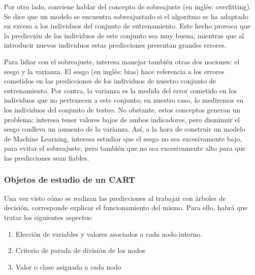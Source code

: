 \documentclass[12pt,twoside]{article}
\begin{document}
Por otro lado, conviene hablar del concepto de sobreajuste (en inglés: overfitting). Se dice que un modelo se encuentra sobreajustado si el algoritmo se ha adaptado en exceso a los individuos del conjunto de entrenamiento. Este hecho provoca que la predicción de los individuos de este conjunto sea muy buena, mientras que al introducir nuevos individuos estas predicciones presentan grandes errores.

Para lidiar con el sobreajuste, interesa manejar también otras dos nociones: el sesgo y la varianza. El sesgo (en inglés: bias) hace referencia a los errores cometidos en las predicciones de los individuos de nuestro conjunto de entrenamiento. Por contra, la varianza es la medida del error cometido en los individuos que no pertenecen a este conjunto; en nuestro caso, lo mediremos en los individuos del conjunto de testeo. No obstante, estos conceptos generan un problema: interesa tener valores bajos de ambos indicadores, pero disminuir el sesgo conlleva un aumento de la varianza. Así, a la hora de construir un modelo de Machine Learning, interesa estudiar que el sesgo no sea excesivamente bajo, para evitar el sobreajuste, pero también que no sea excesivamente alto para que las predicciones sean fiables.


\subsubsection{Objetos de estudio de un CART}

Una vez visto cómo se realizan las predicciones al trabajar con árboles de decisión, corresponde explicar el funcionamiento del mismo. Para ello, habrá que tratar los siguientes aspectos:
\begin{enumerate}
\item Elección de variables y valores asociados a cada nodo interno.
\item Criterio de parada de división de los nodos
\item Valor o clase asignada a cada nodo
\end{enumerate}
\end{document}
